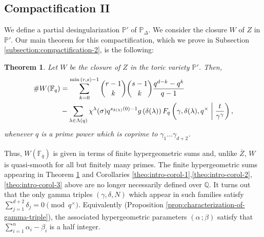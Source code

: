 \documentclass[11pt, reqno]{amsart}
\theoremstyle{plain}
\newtheorem{theo}{Theorem}[section]
\theoremstyle{definition}
\newcommand{\Ps}{\mathbb{P}}
\newcommand{\Q}{\mathbb{Q}}
\newcommand{\F}{\mathbb{F}}
\newcommand{\ga}{\gamma}
\newcommand{\be}{\beta}
\newcommand{\al}{\alpha}
\begin{document}
\subsection*{Compactification II} We define a partial desingularization $\Ps'$ of $\Ps_{\Delta}$. We consider the closure $W$ of $Z$ in $\Ps'$. 
Our main theorem for this compactification, which we prove in Subsection \ref{subsection:compactification-2}, is the following:
\begin{theo}\label{theo:intro-compactification-II}
Let $W$ be the closure of $Z$ in the toric variety $\Ps'$. Then,
\begin{align*}
\#W (\mathbb{F}_q) &= \sum_{k=0}^{\min{(r,s)-1}} {\binom{r-1}{k}}{\binom{s-1}{k}} \frac{q^{d-k} - q^{k} }{q-1}\\
&-\sum_{\lambda \in \Lambda(q)}\chi^{\lambda}(\sigma) q^{s_{\delta(\lambda)} (0)-1} g\left(\delta(\lambda)\right) F_q\left(\gamma,\delta(\lambda),q^\times \biggm\vert \frac{t}{\gamma^\gamma}\right),
\end{align*}
whenever $q$ is a prime power which is coprime to $\ga_1\dots \ga_{d+2}$.
\end{theo}
Thus, $W(\F_q)$ is given in terms of finite hypergeometric sums and, unlike $\overline{Z}$, $W$ is quasi-smooth for all but finitely many primes. The finite hypergeometric sums appearing in Theorem \ref{theo:intro-compactification-II} and Corollaries \ref{theo:intro-corol-1},\ref{theo:intro-corol-2}, \ref{theo:intro-corol-3} above are no longer necessarily defined over $\Q$. It turns out that the only gamma triples $(\ga, \delta,N)$ which appear in such families satisfy
$ \sum_{j=1}^{d+2} \delta_j =0 \pmod{q^\times}$. Equivalently (Proposition \ref{prop:characterization-of-gamma-triple}), the associated hypergeometric parameters $(\al \, ; \be)$ satisfy that $\sum_{i=1}^n \al_i - \be_i $ is a half integer.
\end{document}
